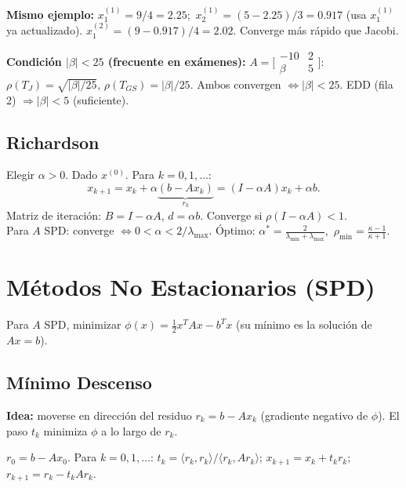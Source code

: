 \documentclass[12pt,a4paper]{article}
\begin{document}
\textbf{Mismo ejemplo:} $x_1^{(1)}=9/4=2.25$;\ $x_2^{(1)}=(5-2.25)/3=0.917$ (usa $x_1^{(1)}$ ya actualizado).
$x_1^{(2)}=(9-0.917)/4=2.02$. Converge más rápido que Jacobi.

\textbf{Condición $|\beta|<25$ (frecuente en exámenes):}
$A=\bigl[\begin{smallmatrix}-10&2\\\beta&5\end{smallmatrix}\bigr]$:
$\rho(T_J)=\sqrt{|\beta|/25}$, $\rho(T_{GS})=|\beta|/25$.
Ambos convergen $\Leftrightarrow |\beta|<25$. EDD (fila 2) $\Rightarrow|\beta|<5$ (suficiente).

\subsection{Richardson}

\begin{algoritmo}[title={Método de Richardson}]
Elegir $\alpha>0$. Dado $x^{(0)}$. Para $k=0,1,\ldots$:
\[x_{k+1}=x_k+\alpha\underbrace{(b-Ax_k)}_{r_k}=(I-\alpha A)x_k+\alpha b.\]
Matriz de iteración: $B=I-\alpha A$, $d=\alpha b$. Converge si $\rho(I-\alpha A)<1$.\\
Para $A$ SPD: converge $\Leftrightarrow 0<\alpha<2/\lambda_{\max}$. Óptimo: $\alpha^*=\frac{2}{\lambda_{\min}+\lambda_{\max}}$,\ $\rho_{\min}=\frac{\kappa-1}{\kappa+1}$.
\end{algoritmo}

\section{Métodos No Estacionarios (SPD)}

Para $A$ SPD, minimizar $\phi(x)=\tfrac{1}{2}x^TAx-b^Tx$ (su mínimo es la solución de $Ax=b$).

\subsection{Mínimo Descenso}

\textbf{Idea:} moverse en dirección del residuo $r_k=b-Ax_k$ (gradiente negativo de $\phi$). El paso $t_k$ minimiza $\phi$ a lo largo de $r_k$.

\begin{algoritmo}[title={Mínimo Descenso}]
$r_0=b-Ax_0$. Para $k=0,1,\ldots$:
$t_k=\langle r_k,r_k\rangle/\langle r_k,Ar_k\rangle$;\quad
$x_{k+1}=x_k+t_kr_k$;\quad $r_{k+1}=r_k-t_kAr_k$.
\end{algoritmo}
\end{document}
